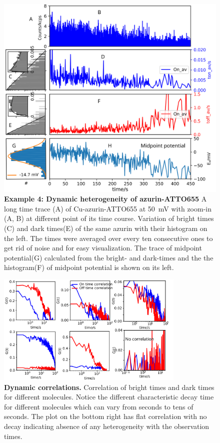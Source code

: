 \begin{figure}[ht]
  \centering
  \includegraphics[width=\textwidth]{dynamic_Point_21_75mV_S105}
  \makeatletter
  \renewcommand{\fnum@figure}{\figurename~S\thefigure}
  \makeatother
  \caption{\textbf{Example 4: Dynamic heterogeneity of azurin-ATTO655}
  A long time trace (A) of Cu-azurin-ATTO655 at \SI{50}{\mV} with zoom-in (A, B) at different point of its time course.
  Variation of bright times (C) and dark times(E) of the same azurin with their histogram on the left.
  The times were averaged over every ten consecutive ones to get rid of noise and for easy visualization.
  The trace of midpoint potential(G) calculated from the bright- and dark-times and the the histogram(F) of midpoint potential is shown on its left.
  }
  \label{SIfig:dynamic_Point_21_75mV_S105}
\end{figure}

\begin{figure}[ht]
  \centering
  \includegraphics[width=0.8\textwidth]{Dynamic_corr_many}
  \caption{\textbf{Dynamic correlations.}
  Correlation of bright times and dark times for different molecules.
  Notice the different characteristic decay time for different molecules which can vary from seconds to tens of seconds.
  The plot on the bottom right has flat correlation with no decay indicating absence of any heterogeneity with the observation times.  
  }
  \label{SIfig:Dynamic_corr_many}
\end{figure}


